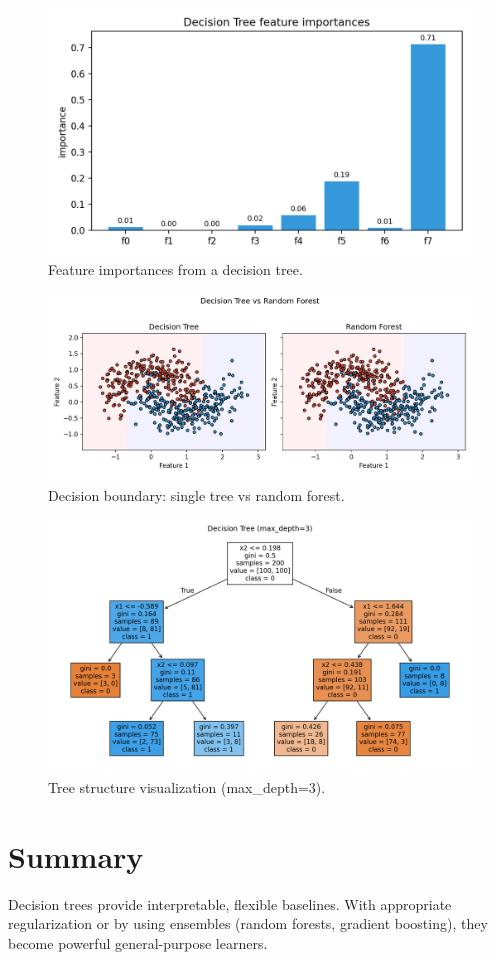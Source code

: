 \documentclass[11pt]{article}
\begin{document}
\begin{figure}[H]
  \centering
  \includegraphics[width=0.85\linewidth]{dt_feature_importances.png}
  \caption{Feature importances from a decision tree.}
  \label{fig:fi}
\end{figure}
\FloatBarrier

\begin{figure}[H]
  \centering
  \includegraphics[width=0.95\linewidth]{dt_vs_rf_boundary.png}
  \caption{Decision boundary: single tree vs random forest.}
  \label{fig:dt_vs_rf}
\end{figure}
\FloatBarrier

\begin{figure}[H]
  \centering
  \includegraphics[width=0.95\linewidth]{dt_tree_plot.png}
  \caption{Tree structure visualization (max\_depth=3).}
  \label{fig:treeplot}
\end{figure}
\FloatBarrier

\section{Summary}
Decision trees provide interpretable, flexible baselines. With appropriate regularization or by using ensembles (random forests, gradient boosting), they become powerful general-purpose learners.
\end{document}
